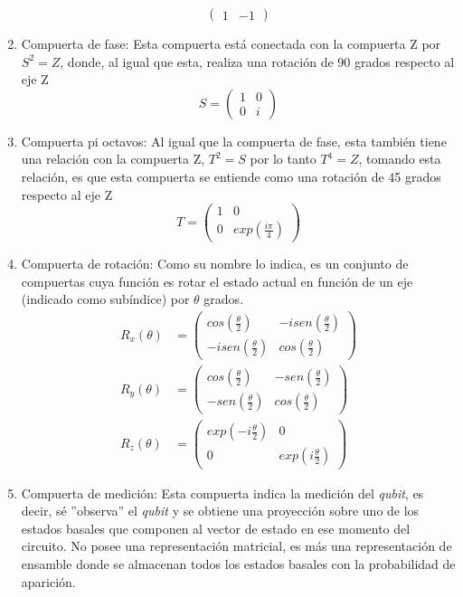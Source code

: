\begin{enumerate}
\begin{equation*}
\begin{pmatrix}
        1 & -1
        \end{pmatrix}
    \end{equation*} 
    \item Compuerta de fase: Esta compuerta está conectada con la compuerta Z por $S^2 = Z$, donde, al igual que esta, realiza una rotación de 90 grados respecto al eje Z
    \begin{equation*}
    S = 
        \begin{pmatrix}
        1 & 0\\
        0 & i
        \end{pmatrix}
    \end{equation*} 
    \item Compuerta pi octavos: Al igual que la compuerta de fase, esta también tiene una relación con la compuerta Z, $T^2=S$ por lo tanto $T^4=Z$, tomando esta relación, es que esta compuerta se entiende como una rotación de 45 grados respecto al eje Z
    \begin{equation*}
    T = 
        \begin{pmatrix}
        1 & 0\\
        0 & exp(\frac{i\pi}{4})
        \end{pmatrix}
    \end{equation*} 
    \item Compuerta de rotación: Como su nombre lo indica, es un conjunto de compuertas cuya función es rotar el estado actual en función de un eje (indicado como subíndice) por $\theta$ grados.
   \begin{align*}
    R_x(\theta) &=
    \begin{pmatrix}
    cos(\frac{\theta}{2}) & -isen(\frac{\theta}{2})\\
    -isen(\frac{\theta}{2}) & cos(\frac{\theta}{2})
    \end{pmatrix} \\
    R_y(\theta) &=
    \begin{pmatrix}
    cos(\frac{\theta}{2}) & -sen(\frac{\theta}{2})\\
    -sen(\frac{\theta}{2}) & cos(\frac{\theta}{2})
    \end{pmatrix} \\
    R_z(\theta) &=
    \begin{pmatrix}
    exp(-i\frac{\theta}{2}) & 0\\
    0 & exp(i\frac{\theta}{2})
    \end{pmatrix}
    \end{align*}
    \item Compuerta de medición: Esta compuerta indica la medición del \textit{qubit}, es decir, sé ''observa'' el \textit{qubit} y se obtiene una proyección sobre uno de los estados basales que componen al vector de estado en ese momento del circuito. No posee una representación matricial, es más una representación de ensamble donde se almacenan todos los estados basales con la probabilidad de aparición.
\end{enumerate}

